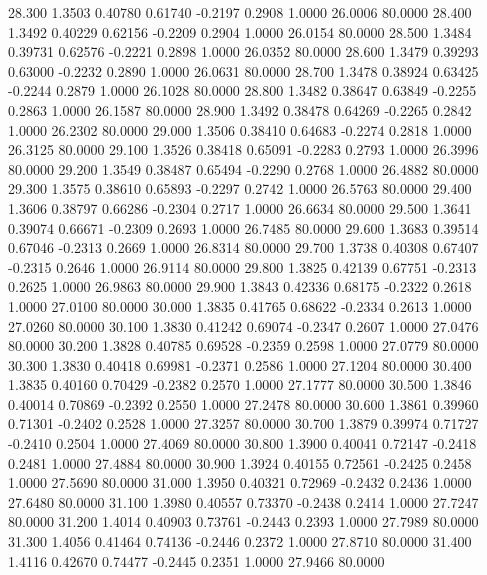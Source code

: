   28.300   1.3503   0.40780   0.61740  -0.2197   0.2908   1.0000  26.0006  80.0000
  28.400   1.3492   0.40229   0.62156  -0.2209   0.2904   1.0000  26.0154  80.0000
  28.500   1.3484   0.39731   0.62576  -0.2221   0.2898   1.0000  26.0352  80.0000
  28.600   1.3479   0.39293   0.63000  -0.2232   0.2890   1.0000  26.0631  80.0000
  28.700   1.3478   0.38924   0.63425  -0.2244   0.2879   1.0000  26.1028  80.0000
  28.800   1.3482   0.38647   0.63849  -0.2255   0.2863   1.0000  26.1587  80.0000
  28.900   1.3492   0.38478   0.64269  -0.2265   0.2842   1.0000  26.2302  80.0000
  29.000   1.3506   0.38410   0.64683  -0.2274   0.2818   1.0000  26.3125  80.0000
  29.100   1.3526   0.38418   0.65091  -0.2283   0.2793   1.0000  26.3996  80.0000
  29.200   1.3549   0.38487   0.65494  -0.2290   0.2768   1.0000  26.4882  80.0000
  29.300   1.3575   0.38610   0.65893  -0.2297   0.2742   1.0000  26.5763  80.0000
  29.400   1.3606   0.38797   0.66286  -0.2304   0.2717   1.0000  26.6634  80.0000
  29.500   1.3641   0.39074   0.66671  -0.2309   0.2693   1.0000  26.7485  80.0000
  29.600   1.3683   0.39514   0.67046  -0.2313   0.2669   1.0000  26.8314  80.0000
  29.700   1.3738   0.40308   0.67407  -0.2315   0.2646   1.0000  26.9114  80.0000
  29.800   1.3825   0.42139   0.67751  -0.2313   0.2625   1.0000  26.9863  80.0000
  29.900   1.3843   0.42336   0.68175  -0.2322   0.2618   1.0000  27.0100  80.0000
  30.000   1.3835   0.41765   0.68622  -0.2334   0.2613   1.0000  27.0260  80.0000
  30.100   1.3830   0.41242   0.69074  -0.2347   0.2607   1.0000  27.0476  80.0000
  30.200   1.3828   0.40785   0.69528  -0.2359   0.2598   1.0000  27.0779  80.0000
  30.300   1.3830   0.40418   0.69981  -0.2371   0.2586   1.0000  27.1204  80.0000
  30.400   1.3835   0.40160   0.70429  -0.2382   0.2570   1.0000  27.1777  80.0000
  30.500   1.3846   0.40014   0.70869  -0.2392   0.2550   1.0000  27.2478  80.0000
  30.600   1.3861   0.39960   0.71301  -0.2402   0.2528   1.0000  27.3257  80.0000
  30.700   1.3879   0.39974   0.71727  -0.2410   0.2504   1.0000  27.4069  80.0000
  30.800   1.3900   0.40041   0.72147  -0.2418   0.2481   1.0000  27.4884  80.0000
  30.900   1.3924   0.40155   0.72561  -0.2425   0.2458   1.0000  27.5690  80.0000
  31.000   1.3950   0.40321   0.72969  -0.2432   0.2436   1.0000  27.6480  80.0000
  31.100   1.3980   0.40557   0.73370  -0.2438   0.2414   1.0000  27.7247  80.0000
  31.200   1.4014   0.40903   0.73761  -0.2443   0.2393   1.0000  27.7989  80.0000
  31.300   1.4056   0.41464   0.74136  -0.2446   0.2372   1.0000  27.8710  80.0000
  31.400   1.4116   0.42670   0.74477  -0.2445   0.2351   1.0000  27.9466  80.0000
